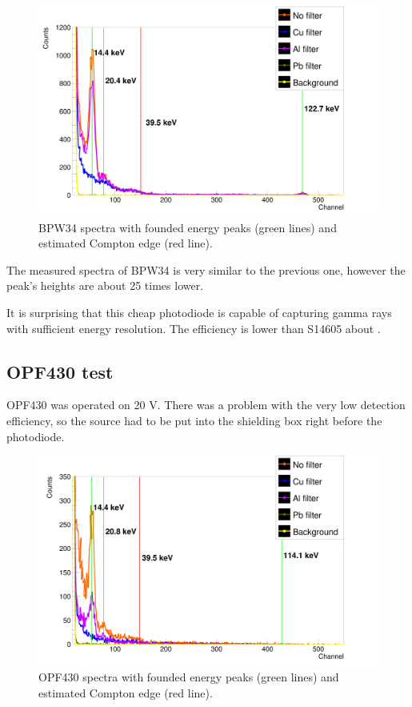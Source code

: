 \begin{figure}[H]
 \centering
 \includegraphics[scale=0.125, angle = 0]{./pictures/BPW34GammaTest.png}
  \caption{BPW34 spectra with founded energy peaks (green lines) and estimated Compton edge (red line).}
 \label{BPW34 spectra}
 
\end{figure}

The measured spectra of BPW34 is very similar to the previous one, however the peak's heights are about 25 times lower.

It is surprising that this cheap photodiode is capable of capturing gamma rays with sufficient energy resolution. The efficiency is lower than S14605 about .
\subsection{OPF430 test}
OPF430 was operated on 20 V. There was a problem with the very low detection efficiency, so the source had to be put into the shielding box right before the photodiode.

\begin{figure}[H]
 \centering
 \includegraphics[scale=0.125, angle = 0]{./pictures/OPF430GammaTest.png}
 \caption{OPF430 spectra with founded energy peaks (green lines) and estimated Compton edge (red line).}
 \label{OPF430 spectra}
 
\end{figure}

